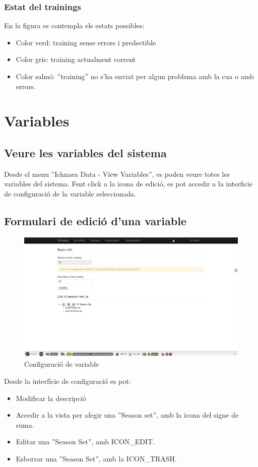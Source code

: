 \subsubsection*{Estat del trainings}
En la figura es contempla els estats possibles:
\begin{itemize}
\item Color verd: training sense errors i predectible
\item Color gris: training actualment corrent
\item Color salm\'{o}: ''training'' no s'ha enviat per algun problema amb la cua o amb errors.
\end{itemize}

\section{Variables}
\subsection{Veure les variables del sistema}
Desde el menu ''Ichnaea  Data - View Variables'', es poden veure totes les variables del sistema. Fent click a la icona de edici\'{o}, es pot accedir a la interficie de configuraci\'{o} de la variable seleccionada.

\subsection{Formulari de edici\'{o} d'una variable}
\begin{figure}[h!]
  \centering
  \includegraphics[scale=0.2]{img/userguide/variable_configuration.png}
  \caption{Configuraci\'{o} de variable}
  \label{fig:placement}
\end{figure}
Desde la interf\'{i}cie de configuraci\'{o} es pot:
\begin{itemize}
\item Modificar la descripci\'{o}
\item Accedir a la vista per afegir una ''Season set'', amb la icona del signe de suma.
\item Editar una ''Season Set'', amb ICON_EDIT.
\item Esborrar una ''Season Set'', amb la ICON_TRASH.
\end{itemize}


